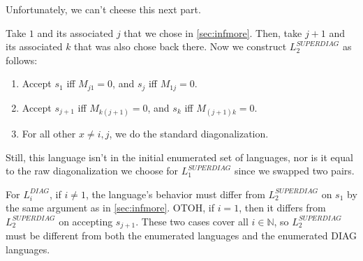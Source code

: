 \documentclass[12pt]{article}
\newcommand{\N}{\mathbb{N}}
\begin{document}
Unfortunately, we can't cheese this next part.

Take $1$ and its associated $j$ that we chose in \ref{sec:infmore}.
Then, take $j+1$ and its associated $k$ that was also chose back there.
Now we construct $L_2^{SUPERDIAG}$ as follows:
\begin{enumerate}[nolistsep]
    \item Accept $s_1$ iff $M_{j1}=0$, and $s_j$ iff $M_{1j}=0$.
    \item Accept $s_{j+1}$ iff $M_{k(j+1)}=0$, and $s_k$ iff $M_{(j+1)k}=0$.
    \item For all other $x \ne i, j$, we do the standard diagonalization.
\end{enumerate}
Still, this language isn't in the initial enumerated set of languages,
nor is it equal to the raw diagonalization we choose for $L_1^{SUPERDIAG}$
since we swapped two pairs.

For $L_i^{DIAG}$, if $i \ne 1$, the language's behavior must differ
from $L_2^{SUPERDIAG}$ on $s_1$ by the same argument as in \ref{sec:infmore}.
OTOH, if $i=1$, then it differs from $L_2^{SUPERDIAG}$ on accepting $s_{j+1}$.
These two cases cover all $i \in \N$, so $L_2^{SUPERDIAG}$
must be different from both the enumerated languages and the
enumerated DIAG languages.
\end{document}
